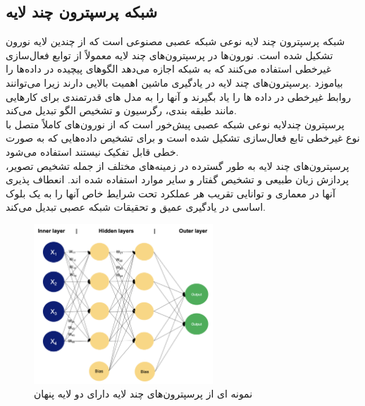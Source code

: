 \subsection{شبکه پرسپترون چند لایه}
شبکه پرسپترون چند لایه  نوعی شبکه عصبی مصنوعی است که از چندین لایه نورون تشکیل شده است. نورون‌ها در پرسپترون‌های چند لایه  معمولاً از
توابع فعال‌سازی غیرخطی  استفاده می‌کنند که به شبکه اجازه می‌دهد الگوهای پیچیده در داده‌ها را بیاموزد .پرسپترون‌های چند لایه در 
یادگیری ماشین اهمیت بالایی دارند زیرا می‌توانند روابط غیرخطی در داده ها را یاد بگیرند و آنها را به مدل های قدرتمندی برای کارهایی مانند طبقه بندی، رگرسیون و تشخیص الگو تبدیل می‌کند. 
\\
پرسپترون چندلایه نوعی شبکه عصبی پیش‌خور است که از نورون‌های کاملاً متصل با نوع غیرخطی تابع فعال‌سازی تشکیل شده است و  برای تشخیص داده‌هایی که به صورت خطی قابل تفکیک نیستند استفاده می‌شود.
\\
پرسپترون‌های چند لایه به طور گسترده در زمینه‌های مختلف از جمله تشخیص تصویر، پردازش زبان طبیعی و تشخیص گفتار و سایر موارد استفاده شده اند. انعطاف پذیری آنها در
معماری و توانایی تقریب هر عملکرد تحت شرایط خاص آنها را به یک بلوک اساسی در یادگیری عمیق و تحقیقات شبکه عصبی تبدیل می‌کند. 

\begin{figure}[h]
    \centering
    \includegraphics[width=0.6\textwidth]{MLP.png}
    \caption{نمونه ای از پرسپترون‌های چند لایه دارای دو لایه پنهان}
\end{figure}


